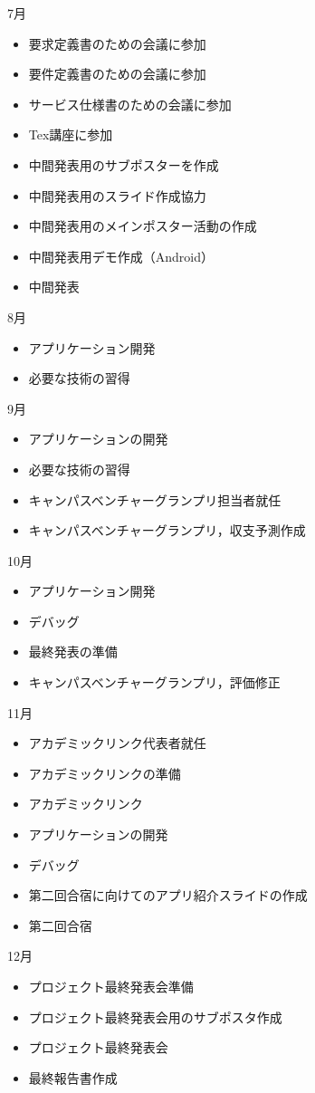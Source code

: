 7月
\begin{itemize}
\item 要求定義書のための会議に参加
\item 要件定義書のための会議に参加
\item サービス仕様書のための会議に参加
\item Tex講座に参加
\item 中間発表用のサブポスターを作成
\item 中間発表用のスライド作成協力
\item 中間発表用のメインポスター活動の作成
\item 中間発表用デモ作成（Android）
\item 中間発表
\end{itemize}
8月
\begin{itemize}
\item アプリケーション開発
\item 必要な技術の習得
\end{itemize}
9月
\begin{itemize}
\item アプリケーションの開発
\item 必要な技術の習得
\item キャンパスベンチャーグランプリ担当者就任
\item キャンパスベンチャーグランプリ，収支予測作成
\end{itemize}
10月
\begin{itemize}
\item アプリケーション開発
\item デバッグ
\item 最終発表の準備
\item キャンパスベンチャーグランプリ，評価修正
\end{itemize}
11月
\begin{itemize}
\item アカデミックリンク代表者就任
\item アカデミックリンクの準備
\item アカデミックリンク
\item アプリケーションの開発
\item デバッグ
\item 第二回合宿に向けてのアプリ紹介スライドの作成
\item 第二回合宿
\end{itemize}
12月
\begin{itemize}
\item プロジェクト最終発表会準備
\item プロジェクト最終発表会用のサブポスタ作成
\item プロジェクト最終発表会
\item 最終報告書作成
\end{itemize}
